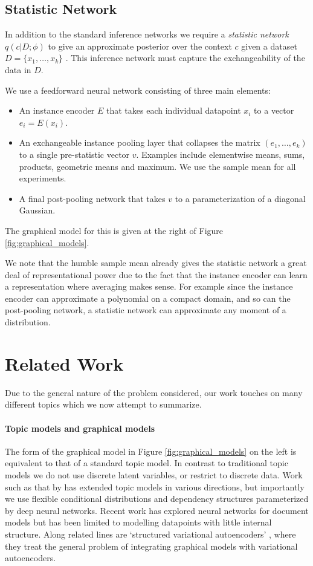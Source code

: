 \documentclass{article} \usepackage{iclr2017_conference,times}
\begin{document}
\subsection{Statistic Network}
\label{statistic_network}
In addition to the standard inference networks we require a \emph{statistic network} $q(c | D ; \phi)$  to give an approximate posterior over the context $c$ given a dataset $D = \{x_1, \dots , x_k \}$ . This inference network must capture the exchangeability of the data in $D$.

We use a feedforward neural network consisting of three main elements:
\begin{itemize}
\item An instance encoder $E$ that takes each individual datapoint $x_i $ to a vector $e_i = E(x_i)$.
\item An exchangeable instance pooling layer that collapses the matrix $(e_1, \dots, e_k)$ to a single pre-statistic vector $v$. Examples include elementwise means, sums, products, geometric means and maximum. We use the sample mean for all experiments.
\item A final post-pooling network that takes $v$ to a parameterization of a diagonal Gaussian.
\end{itemize}
The graphical model for this is given at the right of Figure \ref{fig:graphical_models}.

We note that the humble sample mean already gives the statistic network a great deal of representational power due to the fact that the instance encoder can learn a representation where averaging makes sense. For example since the instance encoder can approximate a polynomial on a compact domain, and so can the post-pooling network, a statistic network can approximate any moment of a distribution.
\vspace{-1em}
\section{Related Work}
Due to the general nature of the problem considered, our work touches on many different topics which we now attempt to summarize.
\vspace{-0.5em}
\paragraph{Topic models and graphical models} The form of the graphical model in Figure \ref{fig:graphical_models} on the left is equivalent to that of a standard topic model. In contrast to traditional topic models we do not use discrete latent variables, or restrict to discrete data. Work such as that by \cite{topic_model} has extended topic models in various directions, but importantly we use flexible conditional distributions and dependency structures parameterized by deep neural networks. Recent work has explored neural networks for document models \citep[see e.g.][]{neural_variational_text} but has been limited to modelling datapoints with little internal structure. Along related lines are `structured variational autoencoders' \citep[see][]{structured_vae}, where they treat the general problem of integrating graphical models with variational autoencoders.
\end{document}
